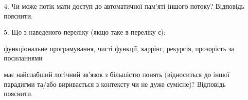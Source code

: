 \documentclass[12pt, ukrainian]{article}
\begin{document}
\begin {large}
{\vspace{5mm}
4. Чи може потік мати доступ до автоматичної пам’яті іншого потоку? Відповідь пояснити.



\vspace{5mm}
5. Що з наведеного переліку (якщо таке в переліку є):

\vspace{4mm}
\qquad функціональне програмування, чисті функції, каррінг, рекурсія, прозорість за посиланнями

\vspace{4mm}
має найслабший логічний зв’язок з більшістю понять (відноситься до іншої парадигми та/або виривається з контексту чи не дуже сумісне)? Відповідь пояснити.

}
\end {large}
\end{document}
